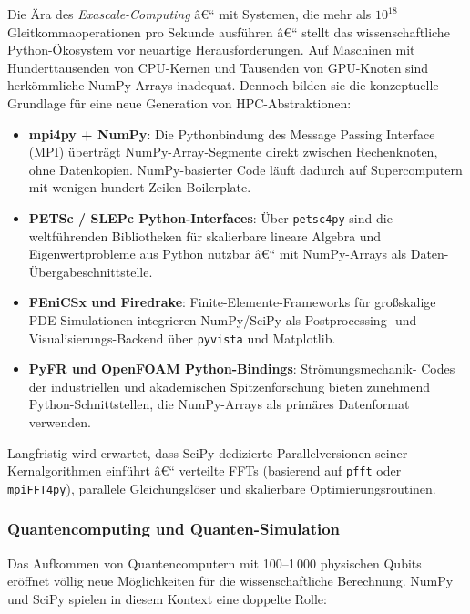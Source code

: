 \documentclass[12pt, a4paper]{article}
\begin{document}
Die Ära des \emph{Exascale-Computing} â€“ mit Systemen, die mehr als
$10^{18}$ Gleitkommaoperationen pro Sekunde ausführen â€“ stellt das
wissenschaftliche Python-Ökosystem vor neuartige Herausforderungen.
Auf Maschinen mit Hunderttausenden von CPU-Kernen und Tausenden von
GPU-Knoten sind herkömmliche NumPy-Arrays inadequat. Dennoch bilden sie
die konzeptuelle Grundlage für eine neue Generation von HPC-Abstraktionen:

\begin{itemize}
  \item \textbf{mpi4py + NumPy}: Die Pythonbindung des Message Passing
    Interface (MPI) überträgt NumPy-Array-Segmente direkt zwischen
    Rechenknoten, ohne Datenkopien. NumPy-basierter Code läuft dadurch
    auf Supercomputern mit wenigen hundert Zeilen Boilerplate.

  \item \textbf{PETSc / SLEPc Python-Interfaces}: Über \texttt{petsc4py}
    sind die weltführenden Bibliotheken für skalierbare lineare Algebra
    und Eigenwertprobleme aus Python nutzbar â€“ mit NumPy-Arrays als
    Daten-Übergabeschnittstelle.

  \item \textbf{FEniCSx und Firedrake}: Finite-Elemente-Frameworks für
    großskalige PDE-Simulationen integrieren NumPy/SciPy als Postprocessing-
    und Visualisierungs-Backend über \texttt{pyvista} und Matplotlib.

  \item \textbf{PyFR und OpenFOAM Python-Bindings}: Strömungsmechanik-
    Codes der industriellen und akademischen Spitzenforschung bieten
    zunehmend Python-Schnittstellen, die NumPy-Arrays als primäres
    Datenformat verwenden.
\end{itemize}

Langfristig wird erwartet, dass SciPy dedizierte Parallelversionen
seiner Kernalgorithmen einführt â€“ verteilte FFTs (basierend auf
\texttt{pfft} oder \texttt{mpiFFT4py}), parallele Gleichungslöser
und skalierbare Optimierungsroutinen.

\subsubsection{Quantencomputing und Quanten-Simulation}
\label{subsubsec:quantum}

Das Aufkommen von Quantencomputern mit 100--1\,000 physischen Qubits
eröffnet völlig neue Möglichkeiten für die wissenschaftliche Berechnung.
NumPy und SciPy spielen in diesem Kontext eine doppelte Rolle:
\end{document}
